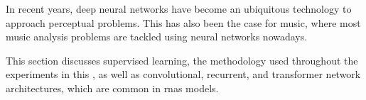 

In recent years, deep neural networks have become an
ubiquitous technology to approach perceptual problems. This
has also been the case for music, where most music analysis
problems are tackled using neural networks nowadays.

This section discusses supervised learning, the methodology used throughout the experiments in this \thesisdiss, as well as convolutional, recurrent, and transformer network architectures, which are common in \glspl{rna} models.
